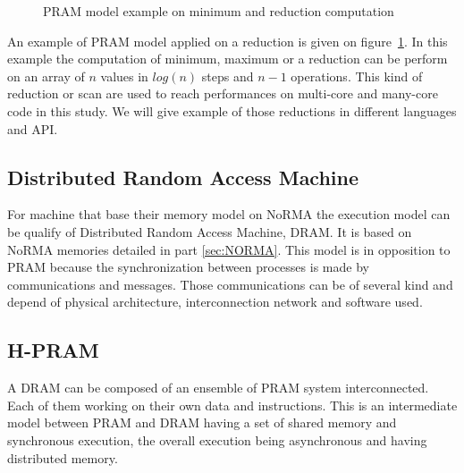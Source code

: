 \begin{figure}[ht!]
{
}
\caption{PRAM model example on minimum and reduction computation}
\label{fig:pram_reduction}
\end{figure}

An example of PRAM model applied on a reduction is given on figure~\ref{fig:pram_reduction}.
In this example the computation of minimum, maximum or a reduction can be perform on an array of $n$ values in $log(n)$ steps and $n-1$ operations.
This kind of reduction or scan are used to reach performances on multi-core and many-core code in this study.
We will give example of those reductions in different languages and API. 

\subsection{Distributed Random Access Machine}
For machine that base their memory model on NoRMA the execution model can be qualify of Distributed Random Access Machine, DRAM.
It is based on NoRMA memories detailed in part \ref{sec:NORMA}.
This model is in opposition to PRAM because the synchronization between processes is made by communications and messages. 
Those communications can be of several kind and depend of physical architecture, interconnection network and software used.

\subsection{H-PRAM}
A DRAM can be composed of an ensemble of PRAM system interconnected. 
Each of them working on their own data and instructions. 
This is an intermediate model between PRAM and DRAM having a set of shared memory and synchronous execution, the overall execution being asynchronous and having distributed memory.

